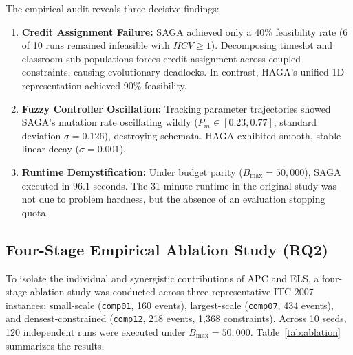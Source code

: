 \documentclass[journal]{IEEEtran}
\begin{document}
\begin{table}[!t]
\caption{Empirical Comparison: Canonical GA, SAGA Reconstructed, and HAGA on \texttt{comp01} (10 Seeds, $B_{\max} = 50,000$)}
\label{tab:saga_comp}
\centering
{}
\end{table}

The empirical audit reveals three decisive findings:
\begin{enumerate}
    \item \textbf{Credit Assignment Failure:} SAGA achieved only a 40\% feasibility rate (6 of 10 runs remained infeasible with $HCV \ge 1$). Decomposing timeslot and classroom sub-populations forces credit assignment across coupled constraints, causing evolutionary deadlocks. In contrast, HAGA's unified 1D representation achieved 90\% feasibility.
    \item \textbf{Fuzzy Controller Oscillation:} Tracking parameter trajectories showed SAGA's mutation rate oscillating wildly ($P_m \in [0.23, 0.77]$, standard deviation $\sigma = 0.126$), destroying schemata. HAGA exhibited smooth, stable linear decay ($\sigma = 0.001$).
    \item \textbf{Runtime Demystification:} Under budget parity ($B_{\max} = 50,000$), SAGA executed in 96.1 seconds. The 31-minute runtime in the original study was not due to problem hardness, but the absence of an evaluation stopping quota.
\end{enumerate}

\subsection{Four-Stage Empirical Ablation Study (RQ2)}
To isolate the individual and synergistic contributions of APC and ELS, a four-stage ablation study was conducted across three representative ITC 2007 instances: small-scale (\texttt{comp01}, 160 events), largest-scale (\texttt{comp07}, 434 events), and densest-constrained (\texttt{comp12}, 218 events, 1,368 constraints). Across 10 seeds, 120 independent runs were executed under $B_{\max} = 50,000$. Table~\ref{tab:ablation} summarizes the results.
\end{document}
